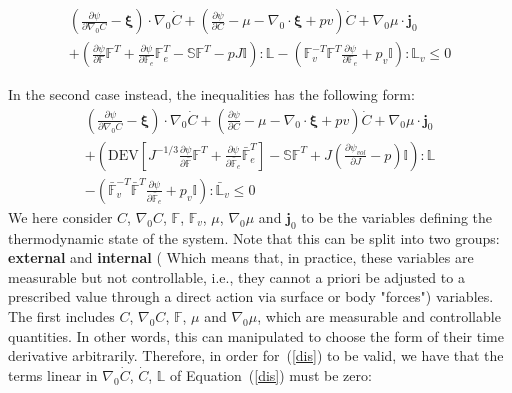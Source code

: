\documentclass[12pt]{extarticle}
\newcommand{\F}{\ensuremath{\mathbb{F}}}
\newcommand{\LL}{\ensuremath{\mathbb{L}}}
\begin{document}
\begin{equation}
\begin{aligned}
\left(\frac{\partial \psi}{\partial \nabla_0 C}-\boldsymbol{\xi}\right)\cdot \nabla_0 \dot{C} + \left(\frac{\partial \psi}{\partial C}-\mu-\nabla_0\cdot\boldsymbol{\xi}+ p v\right) \dot{C}+ \nabla_0 \mu \cdot \mathbf{j}_0 \\
+\left(\frac{\partial \psi}{\partial \F}\F^T + \frac{\partial \psi}{\partial \F_e}\F_e^{T}- \mathbb{S}\F^T - p J \mathbb{I}\right):\LL- \left(\F_v^{-T}\F^T \frac{\partial \psi}{\partial \F_e}+p_v  \mathbb{I}\right):\LL_v \leq 0
\end{aligned}
\label{dis}
\end{equation}

In the second case instead, the inequalities has the following form:
\begin{equation}
\begin{aligned}
\left(\frac{\partial \psi}{\partial \nabla_0 C}-\boldsymbol{\xi}\right)\cdot \nabla_0 \dot{C} + \left(\frac{\partial \psi}{\partial C}-\mu-\nabla_0\cdot\boldsymbol{\xi}+ p v\right) \dot{C}+ \nabla_0 \mu \cdot \mathbf{j}_0 \\
+\left(\text{DEV}\left[J^{-1/3}\frac{\partial \psi}{\partial \bar{\F}}\F^T + \frac{\partial \psi}{\partial \bar{\F}_e}\bar{\F}_e^{T}\right]- \mathbb{S}\F^T +J\left(\frac{\partial \psi_{vol}}{\partial J} - p\right)\mathbb{I}\right):\LL\\
- \left(\bar{\F}_v^{-T}\bar{\F}^T \frac{\partial \psi}{\partial \bar{\F}_e}+p_v  \mathbb{I}\right):\bar{\LL}_v \leq 0
\end{aligned}
\end{equation}
We here consider $C$, $\nabla_0 C$, $\F$, $\F_v$, $\mu$, $\nabla_0 \mu$ and $\mathbf{j}_0$ to be the variables defining the thermodynamic state of the system. Note that this can be split into two groups: \textbf{external} and \textbf{internal} ( Which means that, in practice, these variables
are measurable but not controllable, i.e., they cannot a priori be adjusted to a prescribed
value through a direct action via surface or body "forces") variables. The first includes $C$, $\nabla_0 C$, $\F$,  $\mu$ and $\nabla_0 \mu$, which are measurable and controllable quantities. In other words, this can manipulated to choose the form of their time derivative arbitrarily. Therefore, in order for~(\ref{dis}) to be valid, we have that the terms linear in $\nabla_0 \dot{C}$, $\dot{C}$, $\LL$ of Equation~(\ref{dis}) must be zero:
\end{document}

